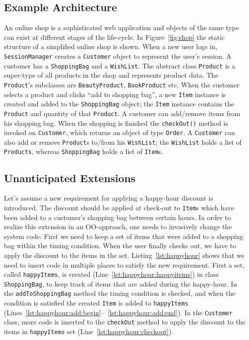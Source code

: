 \subsection{Example Architecture}
An online shop is a sophisticated web application and objects of the same type can exist at different stages of the life-cycle. In Figure~\ref{fig:shop} the static structure of a simplified online shop is shown. When a new user logs in, \lstinline{SessionManager} creates a \lstinline{Customer} object to represent the user's session. A customer has a \lstinline{ShoppingBag} and a \lstinline{WishList}. The abstract class \lstinline{Product} is a super-type of all products in the shop and represents product data. The \lstinline{Product}'s subclasses are \lstinline{BeautyProduct}, \lstinline{BookProduct} etc. When the customer selects a product and clicks ``add to shopping bag'', a new \lstinline{Item} instance is created and added to the \lstinline{ShoppingBag} object; the \lstinline{Item} instance contains the \lstinline{Product} and quantity of that \lstinline{Product}. A customer can add/remove items from his shopping bag. When the shopping is finished the \lstinline{checkOut()} method is invoked on \lstinline{Customer}, which returns an object of type \lstinline{Order}. A \lstinline{Customer} can also add or remove \lstinline{Product}s to/from his \lstinline{WishList}; the \lstinline{WishList} holds a list of \lstinline{Products}, whereas \lstinline{ShoppingBag} holds a list of \lstinline{Item}s.

\subsection{Unanticipated Extensions}
Let's assume a new requirement for applying a happy-hour discount is introduced. The discount should be applied at check-out to \lstinline{Item}s which have been added to a customer's shopping bag between certain hours.
In order to realize this extension in an OO-approach, one needs to invasively change the system code: First we need to keep a set of items that were added to a shopping bag within the timing condition. When the user finally checks out, we have to apply the discount to the items in the set. Listing~\ref{lst:happyhour} shows that we need to insert code in multiple places to satisfy the new requirement. First a set, called \lstinline{happyItems}, is created (Line~\ref{lst:happyhour:happyitems}) in class \lstinline{ShoppingBag}, to keep track of items that are added during the happy-hour. In the \lstinline{addToShoppingBag} method the timing condition is checked, and when the condition is satisfied the created \lstinline{Item} is added to \lstinline{happyItems} (Lines~\ref{lst:happyhour:add:begin}--~\ref{lst:happyhour:add:end}).  In the \lstinline{Customer} class, more code is inserted to the \lstinline{checkOut} method to apply the discount to the items in \lstinline{happyItems} set (Line~\ref{lst:happyhour:checkout}). 


